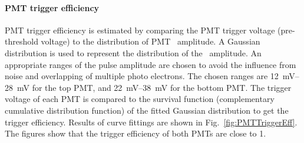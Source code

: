 \paragraph{PMT trigger efficiency}
PMT trigger efficiency is estimated by comparing the PMT trigger voltage (pre-threshold voltage) to the distribution of PMT \sphe\ amplitude. A Gaussian distribution is used to represent the distribution of the \sphe\ amplitude. An appropriate ranges of the pulse amplitude are chosen to avoid the influence from noise and overlapping of multiple photo electrons. The chosen ranges are \SIrange{12}{28}{\mV} for the top PMT, and \SIrange{22}{38}{\mV} for the bottom PMT. The trigger voltage of each PMT is compared to the survival function (complementary cumulative distribution function) of the fitted Gaussian distribution to get the trigger efficiency. Results of curve fittings are shown in Fig.~\ref{fig:PMTTriggerEff}. The figures show that the trigger efficiency of both PMTs are close to 1.
  
